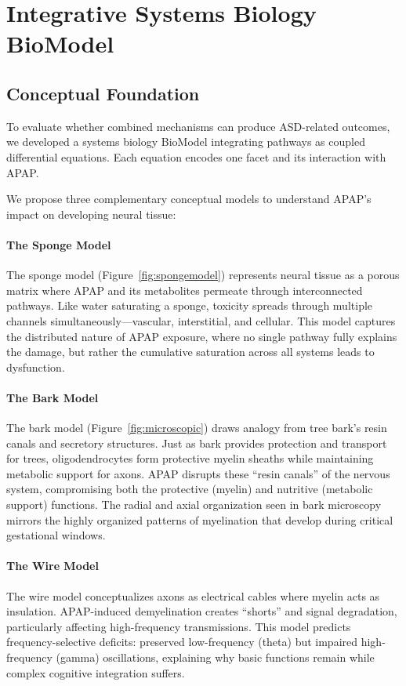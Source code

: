 \documentclass[12pt]{article}
\begin{document}
\section{Integrative Systems Biology BioModel}

\subsection{Conceptual Foundation}
To evaluate whether combined mechanisms can produce ASD-related outcomes, we developed a systems biology BioModel integrating pathways as coupled differential equations. Each equation encodes one facet and its interaction with APAP.

We propose three complementary conceptual models to understand APAP's impact on developing neural tissue:

\paragraph{The Sponge Model}
The sponge model (Figure~\ref{fig:spongemodel}) represents neural tissue as a porous matrix where APAP and its metabolites permeate through interconnected pathways. Like water saturating a sponge, toxicity spreads through multiple channels simultaneously—vascular, interstitial, and cellular. This model captures the distributed nature of APAP exposure, where no single pathway fully explains the damage, but rather the cumulative saturation across all systems leads to dysfunction.

\paragraph{The Bark Model}
The bark model (Figure~\ref{fig:microscopic}) draws analogy from tree bark's resin canals and secretory structures. Just as bark provides protection and transport for trees, oligodendrocytes form protective myelin sheaths while maintaining metabolic support for axons. APAP disrupts these ``resin canals'' of the nervous system, compromising both the protective (myelin) and nutritive (metabolic support) functions. The radial and axial organization seen in bark microscopy mirrors the highly organized patterns of myelination that develop during critical gestational windows.

\paragraph{The Wire Model}
The wire model conceptualizes axons as electrical cables where myelin acts as insulation. APAP-induced demyelination creates ``shorts'' and signal degradation, particularly affecting high-frequency transmissions. This model predicts frequency-selective deficits: preserved low-frequency (theta) but impaired high-frequency (gamma) oscillations, explaining why basic functions remain while complex cognitive integration suffers.
\end{document}
